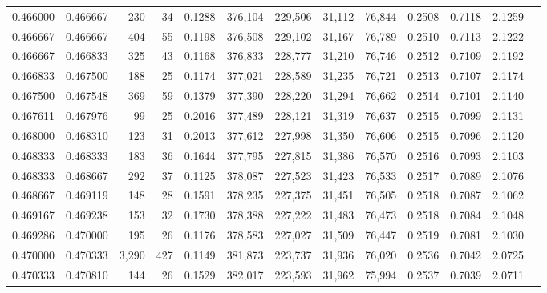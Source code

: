 \begin{tabular}{rrrrrrrrrrrrr}
0.466000 & 0.466667 &   230 &  34 &                                     0.1288 & 376,104 & 229,506 &  31,112 &  76,844 & 0.2508 & 0.7118 & 2.1259 \\
0.466667 & 0.466667 &   404 &  55 &                                     0.1198 & 376,508 & 229,102 &  31,167 &  76,789 & 0.2510 & 0.7113 & 2.1222 \\
0.466667 & 0.466833 &   325 &  43 &                                     0.1168 & 376,833 & 228,777 &  31,210 &  76,746 & 0.2512 & 0.7109 & 2.1192 \\
0.466833 & 0.467500 &   188 &  25 &                                     0.1174 & 377,021 & 228,589 &  31,235 &  76,721 & 0.2513 & 0.7107 & 2.1174 \\
0.467500 & 0.467548 &   369 &  59 &                                     0.1379 & 377,390 & 228,220 &  31,294 &  76,662 & 0.2514 & 0.7101 & 2.1140 \\
0.467611 & 0.467976 &    99 &  25 &                                     0.2016 & 377,489 & 228,121 &  31,319 &  76,637 & 0.2515 & 0.7099 & 2.1131 \\
0.468000 & 0.468310 &   123 &  31 &                                     0.2013 & 377,612 & 227,998 &  31,350 &  76,606 & 0.2515 & 0.7096 & 2.1120 \\
0.468333 & 0.468333 &   183 &  36 &                                     0.1644 & 377,795 & 227,815 &  31,386 &  76,570 & 0.2516 & 0.7093 & 2.1103 \\
0.468333 & 0.468667 &   292 &  37 &                                     0.1125 & 378,087 & 227,523 &  31,423 &  76,533 & 0.2517 & 0.7089 & 2.1076 \\
0.468667 & 0.469119 &   148 &  28 &                                     0.1591 & 378,235 & 227,375 &  31,451 &  76,505 & 0.2518 & 0.7087 & 2.1062 \\
0.469167 & 0.469238 &   153 &  32 &                                     0.1730 & 378,388 & 227,222 &  31,483 &  76,473 & 0.2518 & 0.7084 & 2.1048 \\
0.469286 & 0.470000 &   195 &  26 &                                     0.1176 & 378,583 & 227,027 &  31,509 &  76,447 & 0.2519 & 0.7081 & 2.1030 \\
0.470000 & 0.470333 & 3,290 & 427 &                                     0.1149 & 381,873 & 223,737 &  31,936 &  76,020 & 0.2536 & 0.7042 & 2.0725 \\
0.470333 & 0.470810 &   144 &  26 &                                     0.1529 & 382,017 & 223,593 &  31,962 &  75,994 & 0.2537 & 0.7039 & 2.0711 \\

\end{tabular}
